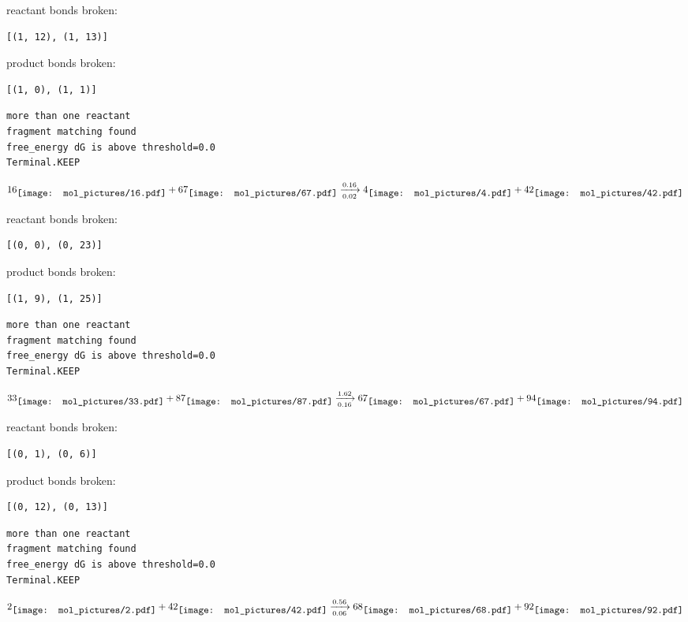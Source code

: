 \documentclass{article}
\begin{document}
reactant bonds broken:\begin{verbatim}
[(1, 12), (1, 13)]
\end{verbatim}
product bonds broken:\begin{verbatim}
[(1, 0), (1, 1)]
\end{verbatim}




\vspace{1cm}
\begin{verbatim}
more than one reactant
fragment matching found
free_energy dG is above threshold=0.0
Terminal.KEEP
\end{verbatim}
$$
16
\raisebox{-.5\height}{\texttt{[image: mol\_pictures/16.pdf]}}
+
67
\raisebox{-.5\height}{\texttt{[image: mol\_pictures/67.pdf]}}
\xrightarrow[0.02]{0.16}
4
\raisebox{-.5\height}{\texttt{[image: mol\_pictures/4.pdf]}}
+
42
\raisebox{-.5\height}{\texttt{[image: mol\_pictures/42.pdf]}}
$$


reactant bonds broken:\begin{verbatim}
[(0, 0), (0, 23)]
\end{verbatim}
product bonds broken:\begin{verbatim}
[(1, 9), (1, 25)]
\end{verbatim}




\vspace{1cm}
\begin{verbatim}
more than one reactant
fragment matching found
free_energy dG is above threshold=0.0
Terminal.KEEP
\end{verbatim}
$$
33
\raisebox{-.5\height}{\texttt{[image: mol\_pictures/33.pdf]}}
+
87
\raisebox{-.5\height}{\texttt{[image: mol\_pictures/87.pdf]}}
\xrightarrow[0.16]{1.62}
67
\raisebox{-.5\height}{\texttt{[image: mol\_pictures/67.pdf]}}
+
94
\raisebox{-.5\height}{\texttt{[image: mol\_pictures/94.pdf]}}
$$


reactant bonds broken:\begin{verbatim}
[(0, 1), (0, 6)]
\end{verbatim}
product bonds broken:\begin{verbatim}
[(0, 12), (0, 13)]
\end{verbatim}




\vspace{1cm}
\begin{verbatim}
more than one reactant
fragment matching found
free_energy dG is above threshold=0.0
Terminal.KEEP
\end{verbatim}
$$
2
\raisebox{-.5\height}{\texttt{[image: mol\_pictures/2.pdf]}}
+
42
\raisebox{-.5\height}{\texttt{[image: mol\_pictures/42.pdf]}}
\xrightarrow[0.06]{0.56}
68
\raisebox{-.5\height}{\texttt{[image: mol\_pictures/68.pdf]}}
+
92
\raisebox{-.5\height}{\texttt{[image: mol\_pictures/92.pdf]}}
$$
\end{document}
